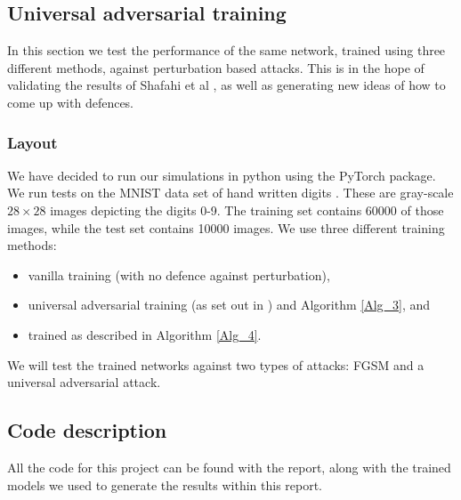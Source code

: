\subsection{Universal adversarial training}

\setlength\parindent{0pt}

In this section we test the performance of the same network, trained using three different methods, against perturbation based attacks. This is in the hope of validating the results of Shafahi et al \cite{shafahi_universal_2018}, as well as generating new ideas of how to come up with defences.

\subsubsection{Layout}

We have decided to run our simulations in python using the PyTorch package. We run tests on the MNIST data set of hand written digits \cite{lecun2010mnist}. These are gray-scale $28 \times 28$ images depicting the digits 0-9. The training set contains 60000 of those images, while the test set contains 10000 images. We use three different training methods:

\begin{itemize}
	\item vanilla training (with no defence against perturbation),
	\item universal adversarial training (as set out in \cite{shafahi_universal_2018}) and Algorithm \ref{Alg_3}, and
	\item trained as described in Algorithm \ref{Alg_4}.
\end{itemize}

We will test the trained networks against two types of attacks: FGSM and a universal adversarial attack.

\subsection{Code description}

All the code for this project can be found with the report, along with the trained models we used to generate the results within this report.\\ 


